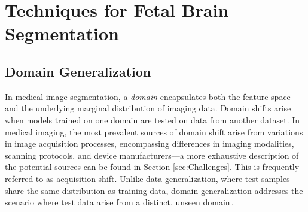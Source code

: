 \chapter{Techniques for Fetal Brain Segmentation} \label{chap:TechniquesForFetalBrainSegmentation}
\vspace{1cm}


\section{Domain Generalization} \label{sec:DomainGeneralization}
In medical image segmentation, a \emph{domain} encapsulates both the feature space and the underlying marginal distribution of imaging data. Domain shifts arise when models trained on one domain are tested on data from another dataset. In medical imaging, the most prevalent sources of domain shift arise from variations in image acquisition processes, encompassing differences in imaging modalities, scanning protocols, and device manufacturers---a more exhaustive description of the potential sources can be found in Section \ref{sec:Challenges}. This is frequently referred to as acquisition shift. Unlike data generalization, where test samples share the same distribution as training data, domain generalization addresses the scenario where test data arise from a distinct, unseen domain\,\cite{Ouyang2023}.

